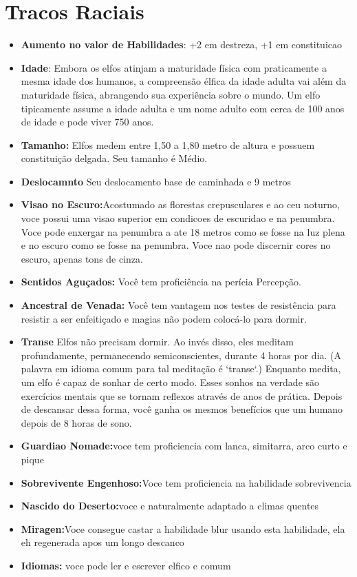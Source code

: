 \documentclass{book}
\begin{document}
\section{Tracos Raciais}
\begin{itemize}
    \item \textbf{Aumento no valor de Habilidades}: +2 em destreza, +1 em constituicao
    \item \textbf{Idade}: Embora os elfos atinjam a maturidade física com praticamente a mesma 
          idade dos humanos, a compreensão élfica da idade adulta vai além da maturidade 
          física, abrangendo sua experiência sobre o mundo. Um elfo tipicamente assume 
          a idade adulta e um nome adulto com cerca de 100 anos de idade e pode viver
          750 anos.
    \item \textbf{Tamanho:} Elfos medem entre 1,50 a 1,80 metro de altura e possuem 
          constituição delgada. Seu tamanho é Médio.
    \item \textbf{Deslocamnto} Seu deslocamento base de caminhada e 9 metros
    \item \textbf{Visao no Escuro:}Acostumado as florestas crepusculares e ao ceu noturno, voce
          possui uma visao superior em condicoes de escuridao e na penumbra. Voce pode 
          enxergar na penumbra a ate 18 metros como se fosse na luz plena e no escuro 
          como se fosse na penumbra. Voce nao pode discernir cores no escuro, apenas tons
          de cinza.
    \item \textbf{Sentidos Aguçados:} Você tem proficiência na perícia Percepção.
    \item \textbf{Ancestral de Venada:} Você tem vantagem nos testes de resistência para 
          resistir  a ser enfeitiçado e magias não podem colocá-lo para dormir.
    \item \textbf{Transe} Elfos não precisam dormir. Ao invés disso, eles meditam 
          profundamente, permanecendo semiconscientes, durante 4 horas por 
          dia. (A palavra em idioma comum para tal meditação é `transe`.) Enquanto
          medita, um elfo é capaz de sonhar de certo modo. Esses sonhos na verdade 
          são exercícios mentais que se tornam reflexos através de anos de prática.
          Depois de descansar dessa forma, você ganha os mesmos benefícios que um
          humano depois de 8 horas de sono.
    \item \textbf{Guardiao Nomade:}voce tem proficiencia com lanca, simitarra, arco curto e  
        pique
    \item \textbf{Sobrevivente Engenhoso:}Voce tem proficiencia na habilidade sobrevivencia
    \item \textbf{Nascido do Deserto:}voce e naturalmente adaptado a climas quentes 
    \item \textbf{Miragen:}Voce consegue castar a habilidade blur usando esta habilidade, ela 
          eh regenerada apos um longo descanco 
     \item \textbf{Idiomas:} voce pode ler e escrever elfico e comum 

\end{itemize}
\end{document}
